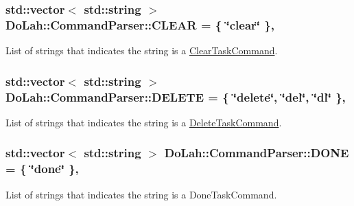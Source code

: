 \subsubsection[{C\+L\+E\+A\+R}]{\setlength{\rightskip}{0pt plus 5cm}std\+::vector$<$ std\+::string $>$ Do\+Lah\+::\+Command\+Parser\+::\+C\+L\+E\+A\+R = \{ \char`\"{}clear\char`\"{} \}\hspace{0.3cm}{\ttfamily [static]}, {\ttfamily [private]}}\label{class_do_lah_1_1_command_parser_a78a083731453c88a2684e788b516a84f}


List of strings that indicates the string is a \hyperlink{class_do_lah_1_1_clear_task_command}{Clear\+Task\+Command}. 

\hypertarget{class_do_lah_1_1_command_parser_a205ebad6759a659219ed0a0decff7c2e}{}
\subsubsection[{D\+E\+L\+E\+T\+E}]{\setlength{\rightskip}{0pt plus 5cm}std\+::vector$<$ std\+::string $>$ Do\+Lah\+::\+Command\+Parser\+::\+D\+E\+L\+E\+T\+E = \{ \char`\"{}delete\char`\"{}, \char`\"{}del\char`\"{}, \char`\"{}dl\char`\"{} \}\hspace{0.3cm}{\ttfamily [static]}, {\ttfamily [private]}}\label{class_do_lah_1_1_command_parser_a205ebad6759a659219ed0a0decff7c2e}


List of strings that indicates the string is a \hyperlink{class_do_lah_1_1_delete_task_command}{Delete\+Task\+Command}. 

\hypertarget{class_do_lah_1_1_command_parser_a225369acfd527549bda2420ae7528987}{}
\subsubsection[{D\+O\+N\+E}]{\setlength{\rightskip}{0pt plus 5cm}std\+::vector$<$ std\+::string $>$ Do\+Lah\+::\+Command\+Parser\+::\+D\+O\+N\+E = \{ \char`\"{}done\char`\"{} \}\hspace{0.3cm}{\ttfamily [static]}, {\ttfamily [private]}}\label{class_do_lah_1_1_command_parser_a225369acfd527549bda2420ae7528987}


List of strings that indicates the string is a Done\+Task\+Command. 

